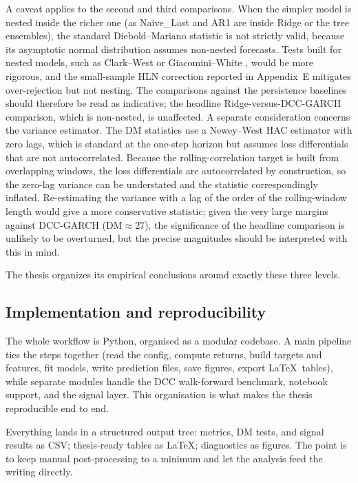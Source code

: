 A caveat applies to the second and third comparisons. When the simpler model is nested inside the richer one (as Naive\_Last and AR1 are inside Ridge or the tree ensembles), the standard Diebold--Mariano statistic is not strictly valid, because its asymptotic normal distribution assumes non-nested forecasts. Tests built for nested models, such as Clark--West or Giacomini--White \cite{clark2007nested,giacomini2006tests}, would be more rigorous, and the small-sample HLN correction reported in Appendix~E mitigates over-rejection but not nesting. The comparisons against the persistence baselines should therefore be read as indicative; the headline Ridge-versus-DCC-GARCH comparison, which is non-nested, is unaffected. A separate consideration concerns the variance estimator. The DM statistics use a Newey--West HAC estimator with zero lags, which is standard at the one-step horizon but assumes loss differentials that are not autocorrelated. Because the rolling-correlation target is built from overlapping windows, the loss differentials are autocorrelated by construction, so the zero-lag variance can be understated and the statistic correspondingly inflated. Re-estimating the variance with a lag of the order of the rolling-window length would give a more conservative statistic; given the very large margins against DCC-GARCH ($\mathrm{DM}\approx 27$), the significance of the headline comparison is unlikely to be overturned, but the precise magnitudes should be interpreted with this in mind.

The thesis organizes its empirical conclusions around exactly these three levels.

\subsection{Implementation and reproducibility}

The whole workflow is Python, organised as a modular codebase. A main pipeline ties the steps together (read the config, compute returns, build targets and features, fit models, write prediction files, save figures, export \LaTeX\ tables), while separate modules handle the DCC walk-forward benchmark, notebook support, and the signal layer. This organisation is what makes the thesis reproducible end to end.

Everything lands in a structured output tree: metrics, DM tests, and signal results as CSV; thesis-ready tables as \LaTeX; diagnostics as figures. The point is to keep manual post-processing to a minimum and let the analysis feed the writing directly.

